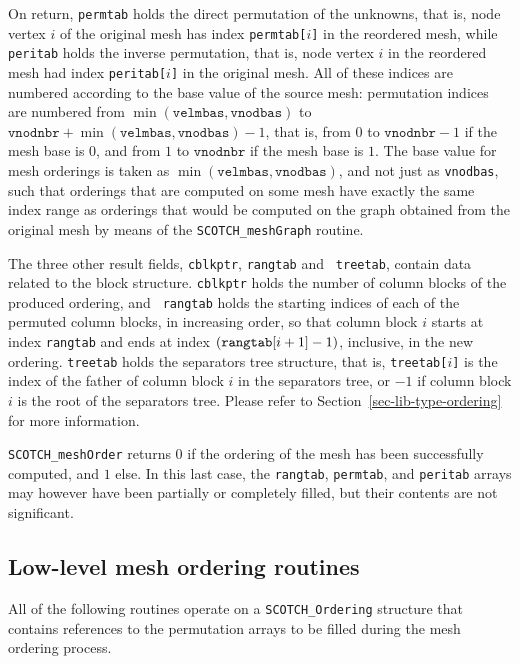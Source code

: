 \begin{itemize}
On return, {\tt permtab} holds the direct permutation of the unknowns,
that is, node vertex $i$ of the original mesh has index {\tt permtab[$i$]}
in the reordered mesh, while {\tt peritab} holds the inverse
permutation, that is, node vertex $i$ in the reordered mesh had index
{\tt peritab[$i$]} in the original mesh. All of these indices are numbered
according to the base value of the source mesh: permutation indices
are numbered from $\min(\mathtt{velmbas},\mathtt{vnodbas})$ to
$\mathtt{vnodnbr} + \min(\mathtt{velmbas},\mathtt{vnodbas}) -
1$, that is, from $0$ to $\mathtt{vnodnbr} - 1$ if the mesh base is
$0$, and from $1$ to $\mathtt{vnodnbr}$ if the mesh base is $1$.
The base value for mesh orderings is taken as
$\min(\mathtt{velmbas},\mathtt{vnodbas})$, and not just as
{\tt vnodbas}, such that orderings that are computed on some mesh
have exactly the same index range as orderings that would be computed
on the graph obtained from the original mesh by means of the
{\tt SCOTCH\_\lbt mesh\lbt Graph} routine.

The three other result fields, {\tt *cblkptr}, {\tt rangtab} and {\tt
treetab}, contain data related to the block structure. {\tt *cblkptr}
holds the number of column blocks of the produced ordering, and {\tt
rangtab} holds the starting indices of each of the permuted column
blocks, in increasing order, so that column block $i$ starts at index
{\tt rangtab\lbt [$i$]} and ends at index $(\mbox{\tt
rangtab}\lbt\mathtt{[}i + 1\mathtt{]} - 1)$, inclusive, in the new
ordering. {\tt treetab} holds the separators tree structure, that is,
{\tt treetab[$i$]} is the index of the father of column block $i$ in
the separators tree, or $-1$ if column block $i$ is the root of the
separators tree. Please refer to Section~\ref{sec-lib-type-ordering}
for more information.

\progret

{\tt SCOTCH\_meshOrder} returns $0$ if the ordering of the mesh has
been successfully computed, and $1$ else. In this last case, the
{\tt rangtab}, {\tt permtab}, and {\tt peritab} arrays may however have
been partially or completely filled, but their contents are not significant.
\end{itemize}

\subsection{Low-level mesh ordering routines}

All of the following routines operate on a {\tt SCOTCH\_\lbt Ordering}
structure that contains references to the permutation arrays to be
filled during the mesh ordering process.

